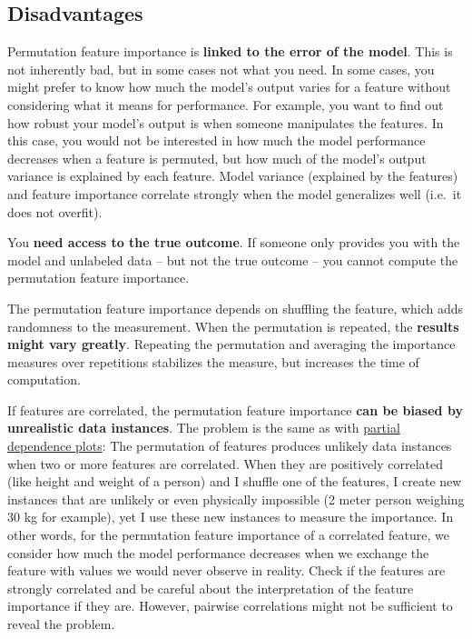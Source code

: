 \documentclass[
  11pt,
]{scrbook}
\begin{document}
\hypertarget{disadvantages-9}{%
\subsection{Disadvantages}\label{disadvantages-9}}

Permutation feature importance is \textbf{linked to the error of the model}.
This is not inherently bad, but in some cases not what you need.
In some cases, you might prefer to know how much the model's output varies for a feature without considering what it means for performance.
For example, you want to find out how robust your model's output is when someone manipulates the features.
In this case, you would not be interested in how much the model performance decreases when a feature is permuted, but how much of the model's output variance is explained by each feature.
Model variance (explained by the features) and feature importance correlate strongly when the model generalizes well (i.e.~it does not overfit).

You \textbf{need access to the true outcome}.
If someone only provides you with the model and unlabeled data -- but not the true outcome -- you cannot compute the permutation feature importance.

The permutation feature importance depends on shuffling the feature, which adds randomness to the measurement.
When the permutation is repeated, the \textbf{results might vary greatly}.
Repeating the permutation and averaging the importance measures over repetitions stabilizes the measure, but increases the time of computation.

If features are correlated, the permutation feature importance \textbf{can be biased by unrealistic data instances}.
The problem is the same as with \protect\hyperlink{pdp}{partial dependence plots}:
The permutation of features produces unlikely data instances when two or more features are correlated.
When they are positively correlated (like height and weight of a person) and I shuffle one of the features, I create new instances that are unlikely or even physically impossible (2 meter person weighing 30 kg for example), yet I use these new instances to measure the importance.
In other words, for the permutation feature importance of a correlated feature, we consider how much the model performance decreases when we exchange the feature with values we would never observe in reality.
Check if the features are strongly correlated and be careful about the interpretation of the feature importance if they are.
However, pairwise correlations might not be sufficient to reveal the problem.
\end{document}
